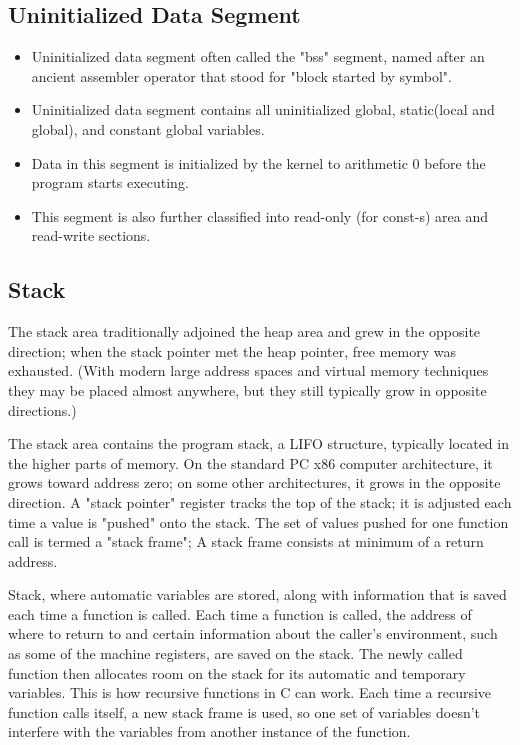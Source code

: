 \documentclass[12pt, a4paper]{article}
\begin{document}
    \subsection{Uninitialized Data Segment}
    \begin{itemize}
        \item Uninitialized data segment often called the "bss" segment, named after an ancient assembler operator that stood for "block started by symbol".
        \item Uninitialized data segment contains all uninitialized global, static(local and global), and constant global variables.
        \item Data in this segment is initialized by the kernel to arithmetic 0 before the program starts executing.    
        \item This segment is also further classified into read-only (for const-s) area and read-write sections.             
    \end{itemize}
    
    \subsection{Stack}
    The stack area traditionally adjoined the heap area and grew in the opposite direction; when the stack pointer met the heap pointer, free memory was exhausted. (With modern large address spaces and virtual memory techniques they may be placed almost anywhere, but they still typically grow in opposite directions.)

    The stack area contains the program stack, a LIFO structure, typically located in the higher parts of memory. On the standard PC x86 computer architecture, it grows toward address zero; on some other architectures, it grows in the opposite direction. A "stack pointer" register tracks the top of the stack; it is adjusted each time a value is "pushed" onto the stack. The set of values pushed for one function call is termed a "stack frame"; A stack frame consists at minimum of a return address.

    Stack, where automatic variables are stored, along with information that is saved each time a function is called. Each time a function is called, the address of where to return to and certain information about the caller's environment, such as some of the machine registers, are saved on the stack. The newly called function then allocates room on the stack for its automatic and temporary variables. This is how recursive functions in C can work. Each time a recursive function calls itself, a new stack frame is used, so one set of variables doesn't interfere with the variables from another instance of the function.
    
\end{document}
